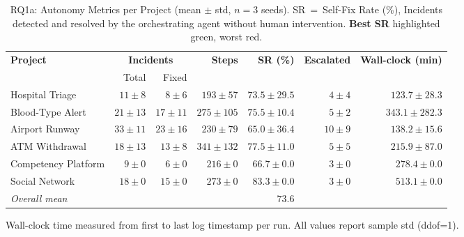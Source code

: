 \begin{table}[t]
\centering
\caption{RQ1a: Autonomy Metrics per Project (mean $\pm$ std, $n=3$ seeds). SR~=~Self-Fix Rate (\%), Incidents detected and resolved by the orchestrating agent without human intervention. \textbf{Best SR} highlighted \colorbox[HTML]{D6EFD6}{green}, worst \colorbox[HTML]{FDDADA}{red}.}
\label{tab:rq1a_autonomy}
\renewcommand{\arraystretch}{1.15}
\begin{tabular}{@{}lrrrrrr@{}}
\toprule
\multirow{2}{*}{\textbf{Project}} & \multicolumn{2}{c}{\textbf{Incidents}} & \multirow{2}{*}{\textbf{Steps}} & \multirow{2}{*}{\textbf{SR (\%)}} & \multirow{2}{*}{\textbf{Escalated}} & \multirow{2}{*}{\textbf{Wall-clock (min)}} \\
\cmidrule(lr){2-3}
 & Total & Fixed & & & & \\
\midrule
\rowcolor[HTML]{E8F4FF} Hospital Triage & $11 \pm 8$ & $8 \pm 6$ & $193 \pm 57$ & $\mathbf{73.5} \pm 29.5$ & $4 \pm 4$ & $123.7 \pm 28.3$ \\
\rowcolor[HTML]{E8F5E8} Blood-Type Alert & $21 \pm 13$ & $17 \pm 11$ & $275 \pm 105$ & $\mathbf{75.5} \pm 10.4$ & $5 \pm 2$ & $343.1 \pm 282.3$ \\
\rowcolor[HTML]{FEF7E0} Airport Runway & $33 \pm 11$ & $23 \pm 16$ & $230 \pm 79$ & $\mathbf{65.0} \pm 36.4$ & $10 \pm 9$ & $138.2 \pm 15.6$ \\
\rowcolor[HTML]{F8EAF2} ATM Withdrawal & $18 \pm 13$ & $13 \pm 8$ & $341 \pm 132$ & $\mathbf{77.5} \pm 11.0$ & $5 \pm 5$ & $215.9 \pm 87.0$ \\
\rowcolor[HTML]{EAF0FF} Competency Platform & $9 \pm 0$ & $6 \pm 0$ & $216 \pm 0$ & $\mathbf{66.7} \pm 0.0$ & $3 \pm 0$ & $278.4 \pm 0.0$ \\
\rowcolor[HTML]{FFF5E0} Social Network & $18 \pm 0$ & $15 \pm 0$ & $273 \pm 0$ & $\mathbf{83.3} \pm 0.0$ & $3 \pm 0$ & $513.1 \pm 0.0$ \\
\midrule
\textit{Overall mean} & & & & $\mathbf{73.6}$ & & \\
\bottomrule
\end{tabular}
\footnotesize Wall-clock time measured from first to last log timestamp per run. All values report sample std (ddof=1).
\end{table}
